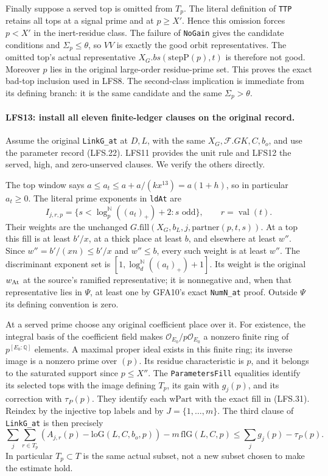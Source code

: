 Finally suppose a served top is omitted from $T_p$.
The literal definition of \texttt{TTP} retains all tops at a
signal prime and at $p\ge X'$.  Hence this omission forces
$p<X'$ in the inert-residue class.  The failure of
\texttt{NoGain} gives the candidate conditions and
$\Sigma_p\le\theta$, so $VV$ is exactly the good orbit
representatives.  The omitted top's actual representative
$X_G.bs(\mathrm{stepP}(p),t)$ is therefore not good.
Moreover $p$ lies in the original large-order residue-prime
set.  This proves the exact bad-top inclusion used in LFS8.
The second-class implication is immediate from its defining
branch: it is the same candidate and the same $\Sigma_p>\theta$.

\paragraph{LFS13: install all eleven finite-ledger clauses on the original record.}
\label{claim:LFS13}
Assume the original \texttt{LinkG\_at} at $D,L$, with the same
$X_G,\mathcal F.GK,C,b_o$, and use the parameter record
(LFS.22).  LFS11 provides the unit rule and LFS12 the served,
high, and zero-unserved clauses.  We verify the others directly.

The top window says
$a\le a_t\le a+a/(kx^{13})=a(1+h)$, so in particular $a_t\ge0$.
The literal prime exponents in \texttt{ldAt} are
\[
 I_{j,r,p}=\{s<\log_p^{\mathbb N}((a_t)_+)+2:s\text{ odd}\},
 \qquad r=\operatorname{val}(t).                             \tag{LFS.31}
\]
Their weights are the unchanged
$G.\mathrm{fill}(X_G,b_L,j,\mathrm{partner}(p,t,s))$.
At a top this fill is at least $b'/x$, at a thick place at
least $b$, and elsewhere at least $w''$.
Since $w''=b'/(xn)\le b'/x$ and $w''\le b$, every such
weight is at least $w''$.
The discriminant exponent set is
$[1,\log_d^{\mathbb N}((a_t)_+)+1]$.
Its weight is the original $w_{\rm At}$ at the source's
ramified representative; it is nonnegative and, when that
representative lies in $\Psi$, at least one by GFA10's exact
\texttt{NumN\_at} proof.  Outside $\Psi$ its defining
convention is zero.

At a served prime choose any original coefficient place over it.
For existence, the integral basis of the coefficient field makes
$\mathcal O_{E_0}/p\mathcal O_{E_0}$ a nonzero finite ring of
$p^{[E_0:\mathbb Q]}$ elements.  A maximal proper ideal exists
in this finite ring; its inverse image is a nonzero prime over
$(p)$.  Its residue characteristic is $p$,
and it belongs to the saturated support since $p\le X''$.
The \texttt{ParametersFill} equalities identify its selected
tops with the image defining $T_p$, its $\mathrm{gain}$ with
$g_j(p)$, and its correction with $\tau_P(p)$.
They identify each $\mathrm{wPart}$ with the exact fill in
(LFS.31).  Reindex by the injective top labels and by
$J=\{1,\ldots,m\}$.  The third clause of
\texttt{LinkG\_at} is then precisely
\[
 \sum_j\sum_{r\in T_p}(A_{j,r}(p)-\mathrm{loG}(L,C,b_o,p))
       -m\,\mathrm{flG}(L,C,p)
          \le\sum_jg_j(p)-\tau_P(p).                       \tag{LFS.32}
\]
In particular $T_p\subset T$ is the same actual subset, not a
new subset chosen to make the estimate hold.

